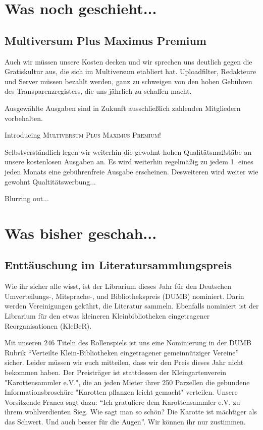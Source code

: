 \documentclass[final]{multiversum}
\begin{document}
\makemultititle
%


\section{Was noch geschieht...}

\subsection{Multiversum Plus Maximus Premium}
Auch wir müssen unsere Kosten decken und wir sprechen uns deutlich gegen die Gratiskultur aus, die sich im Multiversum etabliert hat. Uploadfilter, Redakteure und Server müssen bezahlt werden, ganz zu schweigen von den hohen Gebühren des Transparenzregisters, die uns jährlich zu schaffen macht.

Ausgewählte Ausgaben sind in Zukunft ausschließlich zahlenden Mitgliedern vorbehalten.
\begin{center}Introducing \textsc{Multiversum Plus Maximus Premium!}\end{center}

Selbstverständlich legen wir weiterhin die gewohnt hohen Qualitätsmaßstäbe an unsere kostenlosen Ausgaben an.
Es wird weiterhin regelmäßig zu jedem 1. eines jeden Monats eine gebührenfreie Ausgabe erscheinen.
Desweiteren wird weiter wie gewohnt Qualtitätswerbung...

Blurring out...

\section{Was bisher geschah...}

\subsection{Enttäuschung im Literatursammlungspreis}
Wie ihr sicher alle wisst, ist der Librarium dieses Jahr für den Deutschen Umverteilungs-, Mitsprache-, und Bibliothekspreis (DUMB) nominiert.
Darin werden Vereinigungen gekührt, die Literatur sammeln.
Ebenfalls nominiert ist der Librarium für den etwas kleineren Kleinbibliotheken eingetragener Reorganisationen (KleBeR).

Mit unseren 246 Titeln des Rollenspiels ist uns eine Nominierung in der DUMB Rubrik \enquote{Verteilte Klein-Bibliotheken eingetragener gemeinnütziger Vereine} sicher.
Leider müssen wir euch mitteilen, dass wir den Preis dieses Jahr nicht bekommen haben.
Der Preisträger ist stattdessen der Kleingartenverein "Karottensammler e.V.", die an jeden Mieter ihrer 250 Parzellen die gebundene Informationsbroschüre "Karotten pflanzen leicht gemacht" verteilen.
Unsere Vorsitzende Franca sagt dazu: \enquote{Ich gratuliere dem Karottensammler e.V. zu ihrem wohlverdienten Sieg. 
Wie sagt man so schön? Die Karotte ist mächtiger als das Schwert. Und auch besser für die Augen}.
Wir können ihr nur zustimmen.
\end{document}
